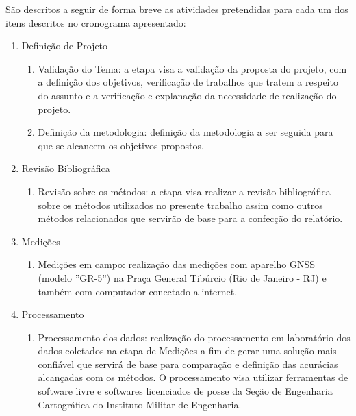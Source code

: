 São descritos a seguir de forma breve as atividades pretendidas para cada um dos itens descritos no cronograma apresentado:

\begin{enumerate}
    \item Definição de Projeto 
        \begin{enumerate}
            \item Validação do Tema: a etapa visa a validação da proposta do projeto, com a definição dos objetivos, verificação de trabalhos que tratem a respeito do assunto e a verificação e explanação da necessidade de realização do projeto.
            
            \item Definição da metodologia: definição da metodologia a ser seguida para que se alcancem os objetivos propostos.
        \end{enumerate}

    \item Revisão Bibliográfica
        \begin{enumerate}
            \item Revisão sobre os métodos: a etapa visa realizar a revisão bibliográfica sobre os métodos utilizados no presente trabalho assim como outros métodos relacionados que servirão de base para a confecção do relatório.
        \end{enumerate}

    \item Medições
        \begin{enumerate}
            \item Medições em campo: realização das medições com aparelho GNSS (modelo ''GR-5'') na Praça General Tibúrcio (Rio de Janeiro - RJ) e também com computador conectado a internet.
        \end{enumerate}
    
    \item Processamento
        \begin{enumerate}
            \item Processamento dos dados: realização do processamento em laboratório dos dados coletados na etapa de Medições a fim de gerar uma solução mais confiável que servirá de base para comparação e definição das acurácias alcançadas com os métodos. O processamento visa utilizar ferramentas de software livre e softwares licenciados de posse da Seção de Engenharia Cartográfica do Instituto Militar de Engenharia.
        \end{enumerate}


\end{enumerate}
